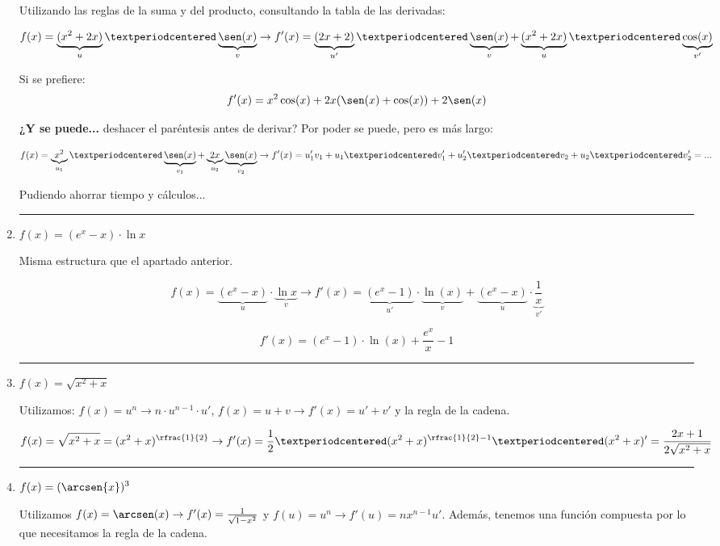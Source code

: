 \documentclass[palatino,nosec,nochap,nobuilddate]{Docencia}
\begin{document}
\begin{enumerate}
	Utilizando las reglas de la suma y del producto, consultando la tabla de las derivadas:

	\[
		f(x) = \underbrace{(x^2+2x)}_{u}·\underbrace{\sen(x)}_{v} \to f'(x) = \underbrace{(2x+2)}_{u'}·\underbrace{\sen(x)}_{v} + \underbrace{(x^2+2x)}_{u}·\underbrace{\cos(x)}_{v'}
	\]

	Si se prefiere:
	\[
		f'(x) = x^2\cos(x) + 2x(\sen(x) + \cos(x)) + 2 \sen(x)
	\]
	
	\textbf{¿Y se puede...} deshacer el paréntesis antes de derivar? Por poder se puede, pero es más largo:

	\[
		f(x) = \underbrace{x^2}_{u_1}·\underbrace{\sen(x)}_{v_1} + \underbrace{2x}_{u_2}\underbrace{\sen(x)}_{v_2} \to f'(x) = u_1'v_1 + u_1·v_1' + u_2'·v_2+u_2·v_2' = ...
	\]

	Pudiendo ahorrar tiempo y cálculos...


\vspace{0.3cm}\hrule\vspace{0.6cm} \item $\displaystyle f(x) = (e^x - x)·\ln{x}$

	Misma estructura que el apartado anterior.

	\[
		f(x) = \underbrace{(e^x - x)}_{u}·\underbrace{\ln{x}}_{v} \to f'(x) = \underbrace{(e^x-1)}_{u'}·\underbrace{\ln(x)}_v + \underbrace{(e^x-x)}_{u}·\underbrace{\frac{1}{x}}_{v'}
	\]

	\[
		f'(x) = (e^x-1)·\ln(x) + \frac{e^x}{x} - 1
	\]





\vspace{0.3cm}\hrule\vspace{0.6cm} \item $\displaystyle f(x) = \sqrt{x^2+x}$

Utilizamos: $f(x) = u^n \to n·u^{n-1}·u'$, $f(x) = u+v \to f'(x) = u'+v'$ y la regla de la cadena.


\[
f(x) = \sqrt{x^2+x} = (x^2+x)^{\rfrac{1}{2}} \to f'(x) = \frac{1}{2}·(x^2+x)^{\rfrac{1}{2}-1}·(x^2+x)' = \frac{2x+1}{2\sqrt{x^2+x}}
\]


\vspace{0.3cm}\hrule\vspace{0.6cm} \item $\displaystyle f(x) = (\arcsen{x})^3$

Utilizamos $f(x) = \arcsen(x) \to f'(x) = \frac{1}{\sqrt{1-x^2}}$ y $f(u) = u^n\to f'(u) = nx^{n-1}u'$. Además, tenemos una función compuesta por lo que necesitamos la regla de la cadena.


\end{enumerate}
\end{document}
